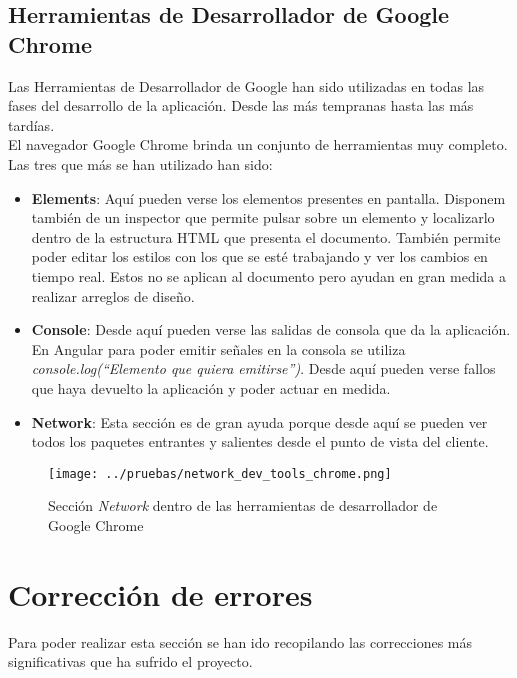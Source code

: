 \subsection{Herramientas de Desarrollador de Google Chrome}
Las Herramientas de Desarrollador de Google \cite{chrome-testing} han sido utilizadas en todas las fases del desarrollo de la aplicación. Desde las más tempranas hasta las más tardías.
\\El navegador Google Chrome brinda un conjunto de herramientas muy completo. Las tres que más se han utilizado han sido:
\begin{itemize}
    \item \textbf{Elements}: Aquí pueden verse los elementos presentes en pantalla. Disponem también de un inspector que permite pulsar sobre un elemento y localizarlo dentro de la estructura HTML que presenta el documento. También permite poder editar los estilos con los que se esté trabajando y ver los cambios en tiempo real. Estos no se aplican al documento pero ayudan en gran medida a realizar arreglos de diseño.
    \item \textbf{Console}: Desde aquí pueden verse las salidas de consola que da la aplicación. En Angular para poder emitir señales en la consola se utiliza \textit{console.log(``Elemento que quiera emitirse'')}. Desde aquí pueden verse fallos que haya devuelto la aplicación y poder actuar en medida.
    \item \textbf{Network}: Esta sección es de gran ayuda porque desde aquí se pueden ver todos los paquetes entrantes y salientes desde el punto de vista del cliente.
\end{itemize}
\begin{figure}[ht]
    \centering
    \texttt{[image: ../pruebas/network\_dev\_tools\_chrome.png]}
    \caption{Sección \textit{Network} dentro de las herramientas de desarrollador de Google Chrome}
\end{figure}
\section{Corrección de errores}
Para poder realizar esta sección se han ido recopilando las correcciones más significativas que ha sufrido el proyecto.

